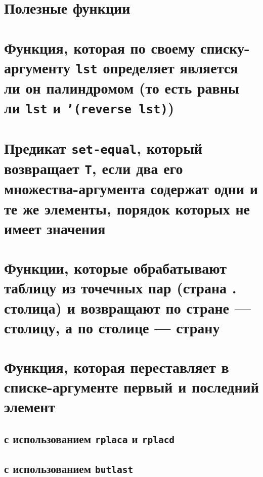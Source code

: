
\section*{Полезные функции}




\section{Функция, которая по своему списку-аргументу \texttt{lst} определяет является ли он палиндромом (то есть равны ли \texttt{lst} и \texttt{'(reverse lst)})}




\section{Предикат \texttt{set-equal}, который возвращает \texttt{T}, если два его множества-аргу\-мента содержат одни и те же элементы, порядок которых не имеет значения}




\section{Функции, которые обрабатывают таблицу из точечных пар (страна . столица) и возвращают по стране --- столицу, а по столице --- страну}




\section{Функция, которая переставляет в списке-аргументе первый и последний элемент}


\subsection{с использованием \texttt{rplaca} и \texttt{rplacd}}



\subsection{с использованием \texttt{butlast}}


